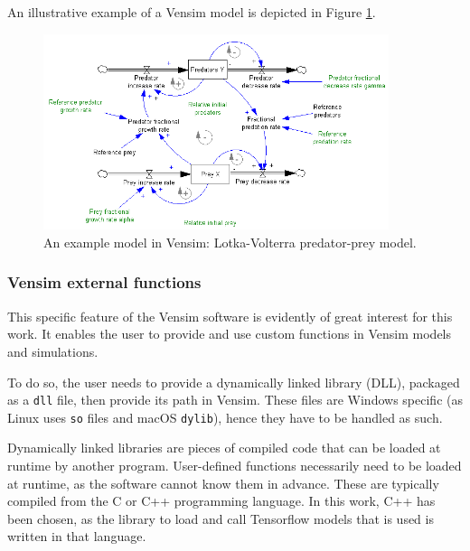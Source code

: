 An illustrative example of a Vensim model is depicted in Figure \ref{fig:vensim-model-example}.

\begin{figure}[h!]
    \includegraphics[width=0.9\textwidth]{resources/images/vensim-model-example.png}
    \caption{An example model in Vensim: Lotka-Volterra predator-prey model.}
    \label{fig:vensim-model-example}
\end{figure}

\subsubsection{Vensim external functions}

This specific feature of the Vensim software is evidently of great interest for this work. It enables the user to provide and use custom functions in Vensim models and simulations.

To do so, the user needs to provide a dynamically linked library (DLL), packaged as a \texttt{dll} file, then provide its path in Vensim. These files are Windows specific (as Linux uses \texttt{so} files and macOS \texttt{dylib}), hence they have to be handled as such.

Dynamically linked libraries are pieces of compiled code that can be loaded at runtime by another program. User-defined functions necessarily need to be loaded at runtime, as the software cannot know them in advance. These are typically compiled from the C or C++ programming language. In this work, C++ has been chosen, as the library to load and call Tensorflow models that is used is written in that language.


